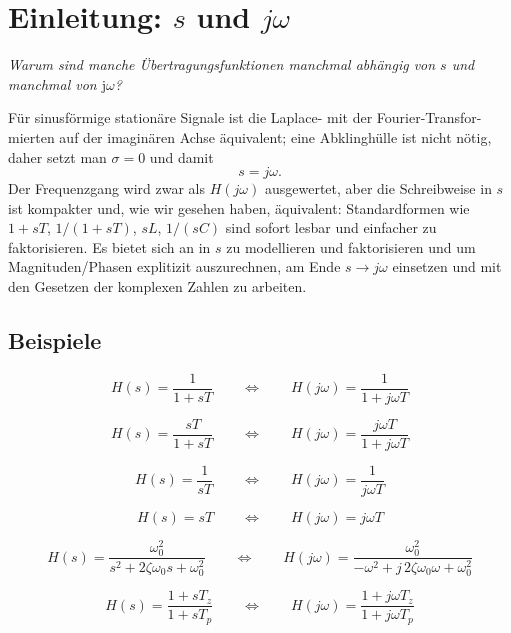 \section*{Einleitung: \(s\) und \(j\omega\)}

\textit{Warum sind manche Übertragungsfunktionen manchmal abhängig von $s$ und manchmal von $\mathrm{j}\omega$?}

\smallskip
\noindent
Für sinusförmige stationäre Signale ist die Laplace- mit der Fourier-Transfor- mierten auf der imaginären Achse äquivalent; eine Abklinghülle ist nicht nötig, daher setzt man \(\sigma=0\) und damit
\[ s = j\omega. \]
Der Frequenzgang wird zwar als \(H(j\omega)\) ausgewertet, aber die Schreibweise in \(s\) ist kompakter und, wie wir gesehen haben, äquivalent: Standardformen wie \(1+sT\), \(1/(1+sT)\), \(sL\), \(1/(sC)\) sind sofort lesbar und einfacher zu faktorisieren. Es bietet sich an in \(s\) zu modellieren und faktorisieren und um Magnituden/Phasen explitizit auszurechnen, am Ende \(s\to j\omega\) einsetzen und mit den Gesetzen der komplexen Zahlen zu arbeiten.


\subsection*{Beispiele}

$$ H(s)=\frac{1}{1+sT}\qquad\Leftrightarrow\qquad H(j\omega)=\frac{1}{1+j\omega T} $$

$$ H(s)=\frac{sT}{1+sT}\qquad\Leftrightarrow\qquad H(j\omega)=\frac{j\omega T}{1+j\omega T} $$

$$ H(s)=\frac{1}{sT}\qquad\Leftrightarrow\qquad H(j\omega)=\frac{1}{j\omega T} $$

$$ H(s)=sT\qquad\Leftrightarrow\qquad H(j\omega)=j\omega T $$

$$ H(s)=\frac{\omega_0^2}{s^2+2\zeta \omega_0 s+\omega_0^2}\qquad\Leftrightarrow\qquad H(j\omega)=\frac{\omega_0^2}{-\omega^2+j\,2\zeta \omega_0 \omega+\omega_0^2} $$

$$ H(s)=\frac{1+sT_{z}}{1+sT_{p}}\qquad\Leftrightarrow\qquad H(j\omega)=\frac{1+j\omega T_{z}}{1+j\omega T_{p}} $$

\newpage
